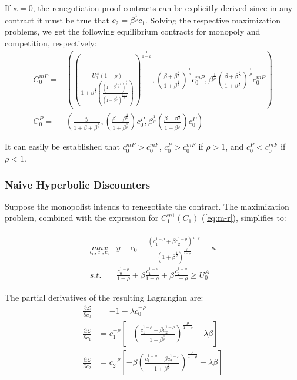 \documentclass[11pt,english]{article}
\theoremstyle{plain}
\theoremstyle{definition}
\begin{document}
If $\kappa=0$, the renegotiation-proof contracts can be explicitly
derived since in any contract it must be true that $c_{2}=\beta^{\frac{1}{\rho}}c_{1}$.
Solving the respective maximization problems, we get the following
equilibrium contracts for monopoly and competition, respectively:
\begin{align}
C_{0}^{mP}= & \left(\left(\frac{U_{0}^{A}\left(1-\rho\right)}{1+\beta^{\frac{1}{\rho}}\left(\frac{\left(1+\beta^{\frac{1-\rho}{\rho}}\right)^{\frac{1}{\rho}}}{\left(1+\beta^{\frac{1}{\rho}}\right)^{\frac{1-\rho}{\rho}}}\right)}\right)^{\frac{1}{1-\rho}},\left(\frac{\beta+\beta^{\frac{1}{\rho}}}{1+\beta^{\frac{1}{\rho}}}\right)^{\frac{1}{\rho}}c_{0}^{mP},\beta^{\frac{1}{\rho}}\left(\frac{\beta+\beta^{\frac{1}{\rho}}}{1+\beta^{\frac{1}{\rho}}}\right)^{\frac{1}{\rho}}c_{0}^{mP}\right)\label{eq:zerokappa-monop}\\
C_{0}^{P}= & \left(\frac{y}{1+\beta+\beta^{\frac{1}{\rho}}},\left(\frac{\beta+\beta^{\frac{1}{\rho}}}{1+\beta^{\frac{1}{\rho}}}\right)c_{0}^{P},\beta^{\frac{1}{\rho}}\left(\frac{\beta+\beta^{\frac{1}{\rho}}}{1+\beta^{\frac{1}{\rho}}}\right)c_{0}^{P}\right)\label{eq:zerokappa-comp}
\end{align}

It can easily be established that $c_{0}^{mP}>c_{0}^{mF}$, $c_{0}^{P}>c_{0}^{mF}$
if $\rho>1$, and $c_{0}^{P}<c_{0}^{mF}$ if $\rho<1$.

\subsubsection{Naive Hyperbolic Discounters}

Suppose the monopolist intends to renegotiate the contract. The maximization
problem, combined with the expression for $C_{1}^{m1}\left(C_{1}\right)$
(\ref{eq:m-r}), simplifies to:

\begin{align}
\underset{c_{0},c_{1},c_{2}}{max} & y-c_{0}-\frac{\left(c_{1}^{1-\rho}+\beta c_{2}^{1-\rho}\right)^{\frac{1}{1-\rho}}}{\left(1+\beta^{\frac{1}{\rho}}\right)^{\frac{\rho}{1-\rho}}}-\kappa\\
s.t. & \frac{c_{0}^{1-\rho}}{1-\rho}+\beta\frac{c_{1}^{1-\rho}}{1-\rho}+\beta\frac{c_{2}^{1-\rho}}{1-\rho}\geq U_{0}^{A}
\end{align}

The partial derivatives of the resulting Lagrangian are: 
\begin{align}
\frac{\partial\mathcal{L}}{\partial c_{0}} & =-1-\lambda c_{0}^{-\rho}\label{eq:L0}\\
\frac{\partial\mathcal{L}}{\partial c_{1}} & =c_{1}^{-\rho}\left[-\left(\frac{c_{1}^{1-\rho}+\beta c_{2}^{1-\rho}}{1+\beta^{\frac{1}{\rho}}}\right)^{\frac{\rho}{1-\rho}}-\lambda\beta\right]\label{eq:L1}\\
\frac{\partial\mathcal{L}}{\partial c_{2}} & =c_{2}^{-\rho}\left[-\beta\left(\frac{c_{1}^{1-\rho}+\beta c_{2}^{1-\rho}}{1+\beta^{\frac{1}{\rho}}}\right)^{\frac{\rho}{1-\rho}}-\lambda\beta\right]\label{eq:L2}
\end{align}
\end{document}
